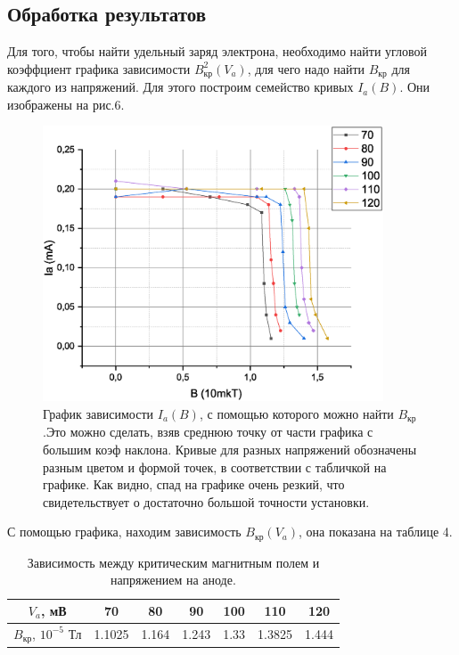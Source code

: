 \documentclass[a4paper, 14pt]{extarticle}%
\newcommand\ECaption[1]{%
     \captionsetup{font=footnotesize}%
     \caption{#1}}
\begin{document}
\subsection*{Обработка результатов}
Для того, чтобы найти удельный заряд электрона, необходимо найти угловой коэффциент графика зависимости $B^2_{\text{кр}}(V_a)$, для чего надо найти $B_{\text{кр}}$ для каждого из напряжений. Для этого построим семейство кривых $I_a(B)$. Они изображены на рис.6.

\begin{figure}[h!]
\begin{center}
\includegraphics[width=0.9\textwidth]{grBI}
\end{center}
\ECaption{График зависимости $I_a(B)$, с помощью которого можно найти $B_{\text{кр}}$.Это можно сделать, взяв среднюю точку от части графика с большим коэф наклона. Кривые для разных напряжений обозначены разным цветом и формой точек, в соответствии с табличкой на графике. Как видно, спад на графике очень резкий, что свидетельствует о достаточно большой точности установки.}
\end{figure}
 
С помощью графика, находим зависимость $B_{\text{кр}}(V_a)$, она показана на таблице 4.

\begin{table}[h!]
\begin{center}
\begin{tabular}{|c|c|c|c|c|c|c|}
\hline
\rowcolor[HTML]{9698ED} 
$V_a$, мВ           & 70     & 80    & 90    & 100  & 110    & 120   \\ \hline
$B_{\text{кр}}$, $10^{-5}$ Тл & 1.1025 & 1.164 & 1.243 & 1.33 & 1.3825 & 1.444 \\ \hline
\end{tabular}
\ECaption{Зависимость между критическим магнитным полем и напряжением на аноде.}
\end{center}
\end{table}
\end{document}
